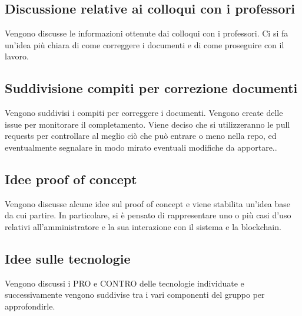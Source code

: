 \subsection*{Discussione relative ai colloqui con i professori}
Vengono discusse le informazioni ottenute dai colloqui con i professori. Ci si fa un'idea più chiara di come correggere i documenti e di come proseguire con il lavoro.
\subsection*{Suddivisione compiti per correzione documenti}
Vengono suddivisi i compiti per correggere i documenti. Vengono create delle issue per monitorare il completamento. Viene deciso che si utilizzeranno le pull requests per controllare al meglio ciò che può entrare o meno nella repo, ed eventualmente segnalare in modo mirato eventuali modifiche da apportare..
\subsection*{Idee proof of concept}
Vengono discusse alcune idee sul proof of concept e viene stabilita un'idea base da cui partire.
In particolare, si è pensato di rappresentare uno o più casi d'uso relativi all'amministratore e la sua interazione con il sistema e la blockchain.
\subsection*{Idee sulle tecnologie}
Vengono discussi i PRO e CONTRO delle tecnologie individuate e successivamente vengono suddivise tra i vari componenti del gruppo per approfondirle.
